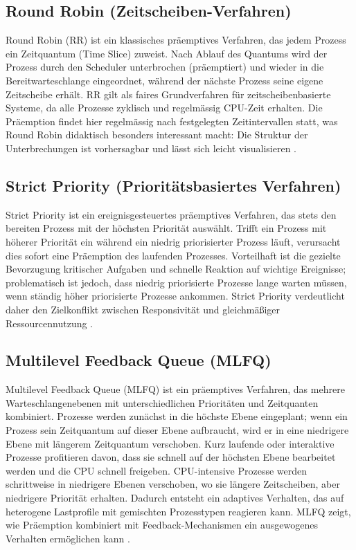 \subsection{Round Robin (Zeitscheiben-Verfahren)}

Round Robin (RR) ist ein klassisches präemptives Verfahren, das jedem Prozess ein Zeitquantum (Time Slice) zuweist. Nach Ablauf des Quantums wird der Prozess durch den Scheduler unterbrochen (präemptiert) und wieder in die Bereitwarteschlange eingeordnet, während der nächste Prozess seine eigene Zeitscheibe erhält. RR gilt als faires Grundverfahren für zeitscheibenbasierte Systeme, da alle Prozesse zyklisch und regelmässig CPU-Zeit erhalten. Die Präemption findet hier regelmässig nach festgelegten Zeitintervallen statt, was Round Robin didaktisch besonders interessant macht: Die Struktur der Unterbrechungen ist vorhersagbar und lässt sich leicht visualisieren \cite{silberschatz2018operating}.

\subsection{Strict Priority (Prioritätsbasiertes Verfahren)}

Strict Priority ist ein ereignisgesteuertes präemptives Verfahren, das stets den bereiten Prozess mit der höchsten Priorität auswählt. Trifft ein Prozess mit höherer Priorität ein während ein niedrig priorisierter Prozess läuft, verursacht dies sofort eine Präemption des laufenden Prozesses. Vorteilhaft ist die gezielte Bevorzugung kritischer Aufgaben und schnelle Reaktion auf wichtige Ereignisse; problematisch ist jedoch, dass niedrig priorisierte Prozesse lange warten müssen, wenn ständig höher priorisierte Prozesse ankommen. Strict Priority verdeutlicht daher den Zielkonflikt zwischen Responsivität und gleichmäßiger Ressourcennutzung \cite{tanenbaum2014modern}.

\subsection{Multilevel Feedback Queue (MLFQ)}

Multilevel Feedback Queue (MLFQ) ist ein präemptives Verfahren, das mehrere Warteschlangenebenen mit unterschiedlichen Prioritäten und Zeitquanten kombiniert. Prozesse werden zunächst in die höchste Ebene eingeplant; wenn ein Prozess sein Zeitquantum auf dieser Ebene aufbraucht, wird er in eine niedrigere Ebene mit längerem Zeitquantum verschoben. Kurz laufende oder interaktive Prozesse profitieren davon, dass sie schnell auf der höchsten Ebene bearbeitet werden und die CPU schnell freigeben. CPU-intensive Prozesse werden schrittweise in niedrigere Ebenen verschoben, wo sie längere Zeitscheiben, aber niedrigere Priorität erhalten. Dadurch entsteht ein adaptives Verhalten, das auf heterogene Lastprofile mit gemischten Prozesstypen reagieren kann. MLFQ zeigt, wie Präemption kombiniert mit Feedback-Mechanismen ein ausgewogenes Verhalten ermöglichen kann \cite{silberschatz2018operating,meing2025mlfq}.

